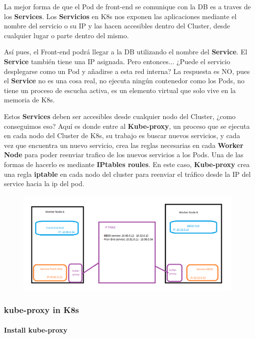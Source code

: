 \documentclass{article}
\begin{document}
La mejor forma de que el Pod de front-end se comunique con la DB es a traves de los \textbf{Services}. Los \textbf{Servicios} en K8s nos exponen las aplicaciones mediante el nombre del servicio o su IP y las hacen accesibles dentro del Cluster, desde cualquier lugar o parte dentro del mismo.

Así pues, el Front-end podrá llegar a la DB utilizando el nombre del \textbf{Service}. El \textbf{Service} también tiene una IP asignada. Pero entonces... ¿Puede el servicio desplegarse como un Pod y añadirse a esta red interna? La respuesta es NO, pues el \textbf{Service} no es una cosa real, no ejecuta ningún contenedor como los Pods, no tiene un proceso de escucha activa, es un elemento virtual que solo vive en la memoria de K8s.

Estos \textbf{Services} deben ser accesibles desde cualquier nodo del Cluster, ¿como conseguimos eso? Aquí es donde entre al \textbf{Kube-proxy}, un proceso que se ejecuta en cada nodo del Cluster de K8s, su trabajo es buscar nuevos servicios, y cada vez que encuentra un nuevo servicio, crea las reglas necesarias en cada \textbf{Worker Node} para poder reenviar trafico de los nuevos servicios a los Pods. Una de las formas de hacerlo es mediante \textbf{IPtables roules}. En este caso, \textbf{Kube-proxy} crea una regla \textbf{iptable} en cada nodo del cluster para reenviar el tráfico desde la IP del service hacia la ip del pod.

\begin{figure}[H]
    \centering
    \includegraphics[scale=0.4]{pictures/image2.png}
\end{figure}

\subsubsection{kube-proxy in K8s}

\paragraph{Install kube-proxy}
\end{document}
